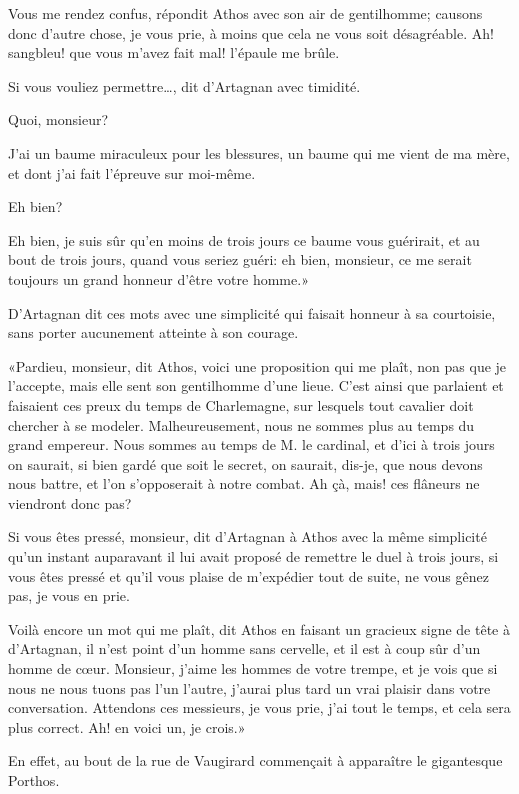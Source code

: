 \speak  Vous me rendez confus, répondit Athos avec son air de gentilhomme; causons donc d'autre chose, je vous prie, à moins que cela ne vous soit désagréable. Ah! sangbleu! que vous m'avez fait mal! l'épaule me brûle. 

\speak  Si vous vouliez permettre\dots, dit d'Artagnan avec timidité. 

\speak  Quoi, monsieur? 

\speak  J'ai un baume miraculeux pour les blessures, un baume qui me vient de ma mère, et dont j'ai fait l'épreuve sur moi-même. 

\speak  Eh bien? 

\speak  Eh bien, je suis sûr qu'en moins de trois jours ce baume vous guérirait, et au bout de trois jours, quand vous seriez guéri: eh bien, monsieur, ce me serait toujours un grand honneur d'être votre homme.» 

D'Artagnan dit ces mots avec une simplicité qui faisait honneur à sa courtoisie, sans porter aucunement atteinte à son courage. 

«Pardieu, monsieur, dit Athos, voici une proposition qui me plaît, non pas que je l'accepte, mais elle sent son gentilhomme d'une lieue. C'est ainsi que parlaient et faisaient ces preux du temps de Charlemagne, sur lesquels tout cavalier doit chercher à se modeler. Malheureusement, nous ne sommes plus au temps du grand empereur. Nous sommes au temps de M. le cardinal, et d'ici à trois jours on saurait, si bien gardé que soit le secret, on saurait, dis-je, que nous devons nous battre, et l'on s'opposerait à notre combat. Ah çà, mais! ces flâneurs ne viendront donc pas? 

\speak  Si vous êtes pressé, monsieur, dit d'Artagnan à Athos avec la même simplicité qu'un instant auparavant il lui avait proposé de remettre le duel à trois jours, si vous êtes pressé et qu'il vous plaise de m'expédier tout de suite, ne vous gênez pas, je vous en prie. 

\speak  Voilà encore un mot qui me plaît, dit Athos en faisant un gracieux signe de tête à d'Artagnan, il n'est point d'un homme sans cervelle, et il est à coup sûr d'un homme de cœur. Monsieur, j'aime les hommes de votre trempe, et je vois que si nous ne nous tuons pas l'un l'autre, j'aurai plus tard un vrai plaisir dans votre conversation. Attendons ces messieurs, je vous prie, j'ai tout le temps, et cela sera plus correct. Ah! en voici un, je crois.» 

En effet, au bout de la rue de Vaugirard commençait à apparaître le gigantesque Porthos. 

